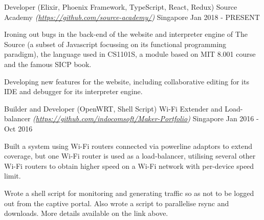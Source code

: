 \begin{cventries}
\cventry
    {Developer (Elixir, Phoenix Framework, TypeScript, React, Redux)} %
    {Source Academy \textmd{\em\tiny(\url{https://github.com/source-academy/})}} %
    {Singapore} %
    {Jan 2018 - PRESENT} %
    {
      \begin{cvitems} %
      	\item {Ironing out bugs in the back-end of the website and interpreter engine of The Source (a subset of Javascript focussing on its functional programming paradigm), the language used in CS1101S, a module based on MIT 8.001 course and the famous SICP book.}
      	\item {Developing new features for the website, including collaborative editing for its IDE and debugger for its interpreter engine.}
      \end{cvitems}
    }

\cventry
    {Builder and Developer (OpenWRT, Shell Script)} %
    {Wi-Fi Extender and Load-balancer \textmd{\em\tiny (\url{https://github.com/indocomsoft/Maker-Portfolio})}} %
    {Singapore} %
    {Jan 2016 - Oct 2016} %
    {
      \begin{cvitems} %
      	\item {Built a system using Wi-Fi routers connected via powerline adaptors to extend coverage, but one Wi-Fi router is used as a load-balancer, utilising several other Wi-Fi routers to obtain higher speed on a Wi-Fi network with per-device speed limit.}
      	\item {Wrote a shell script for monitoring and generating traffic so as not to be logged out from the captive portal. Also wrote a script to parallelise rsync and downloads. More details available on the link above.}
      \end{cvitems}
    }
\end{cventries}
